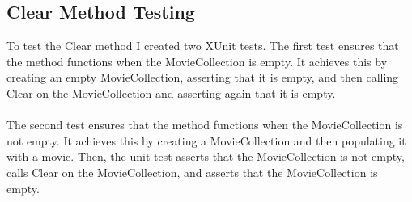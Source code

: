 \documentclass[12pt,a4paper]{article}
\begin{document}
		\subsection{Clear Method Testing}
			To test the Clear method I created two XUnit tests. The first test ensures 
			that the method functions when the MovieCollection is empty. It achieves 
			this by creating an empty MovieCollection, asserting that it is empty, and 
			then calling Clear on the MovieCollection and asserting again that it is 
			empty.\\
			\\
			The second test ensures that the method functions when the MovieCollection 
			is not empty. It achieves this by creating a MovieCollection and then 
			populating it with a movie. Then, the unit test asserts that the MovieCollection 
			is not empty, calls Clear on the MovieCollection, and asserts that the 
			MovieCollection is empty.\\
\end{document}
